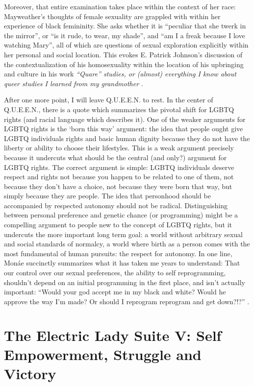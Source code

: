 \documentclass[a4paper, 11pt]{article} %
\begin{document}
Moreover, that entire examination takes place within the context of her race: Mayweather's thoughts of female sexuality are grappled with within her experience of black femininity.
She asks whether it is ``peculiar that she twerk in the mirror'', or ``is it rude, to wear, my shade'', and ``am I a freak because I love watching Mary'', all of which are questions of sexual exploration explicitly within her personal and social location.
This evokes E. Patrick Johnson's discussion of the contextualization of his homosexuality within the location of his upbringing and culture in his work \emph{``Quare'' studies, or (almost) everything I know about queer studies I learned from my grandmother} \cite{johnson2001quare}.

After one more point, I will leave Q.U.E.E.N. to rest.
In the center of Q.U.E.E.N., there is a quote which summarizes the pivotal shift for LGBTQ rights (and racial language which describes it).
One of the weaker arguments for LGBTQ rights is the `born this way' argument: the idea that people ought give LGBTQ individuals rights and basic human dignity because they do not have the liberty or ability to choose their lifestyles.
This is a weak argument precisely because it undercuts what should be the central (and only?) argument for LGBTQ rights.
The correct argument is simple: LGBTQ individuals deserve respect and rights not because you happen to be related to one of them, not because they don't have a choice, not because they were born that way, but simply because they are people.
The idea that personhood should be accompanied by respected autonomy should not be radical.
Distinguishing between personal preference and genetic chance (or programming) might be a compelling argument to people new to the concept of LGBTQ rights, but it undercuts the more important long term goal: a world without arbitrary sexual and social standards of normalcy, a world where birth as a person comes with the most fundamental of human pursuits: the respect for autonomy. 
In one line, Mon\'ae succinctly summarizes what it has taken me years to understand: That our control over our sexual preferences, the ability to self reprogramming, shouldn't depend on an initial programming in the first place, and isn't actually important:
``Would your god accept me in my black and white? Would he approve the way I'm made? Or should I reprogram reprogram and get down?!?'' \cite{queen}.



\section*{The Electric Lady Suite V: Self Empowerment, Struggle and Victory}
\end{document}
